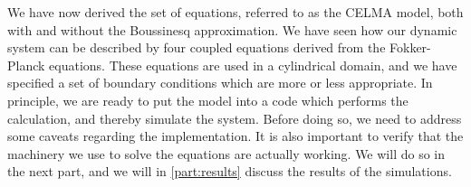 We have now derived the set of equations, referred to as the CELMA model, both with and without the Boussinesq approximation.
We have seen how our dynamic system can be described by four coupled equations derived from the Fokker-Planck equations.
These equations are used in a cylindrical domain, and we have specified a set of boundary conditions which are more or less appropriate.
In principle, we are ready to put the model into a code which performs the calculation, and thereby simulate the system.
Before doing so, we need to address some caveats regarding the implementation.
It is also important to verify that the machinery we use to solve the equations are actually working.
We will do so in the next part, and we will in \cref{part:results} discuss the results of the simulations.
